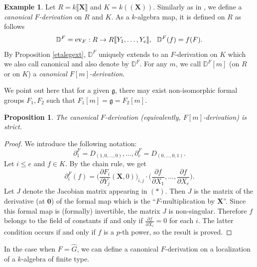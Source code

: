 \documentclass[10pt]{amsart}
\newtheorem{prop}[theorem]{Proposition}
\theoremstyle{definition}
\newtheorem{example}[theorem]{Example}
\begin{document}
\begin{example}\label{canex}
Let $R=k\llbracket \mathbf{X}\rrbracket$ and $K=k((\mathbf{X}))$. Similarly as in \cite[Section 3.2]{HK1}, we define a \emph{canonical $F$-derivation} on $R$ and $K$. As a $k$-algebra map, it is defined on $R$ as follows
$$\mathbb{D}^F=\operatorname{ev}_F:R\to R\llbracket Y_1,\ldots,Y_e\rrbracket,\ \ \mathbb{D}^F(f)=f(F).$$
By Proposition \ref{etalegext}, $\mathbb{D}^F$ uniquely extends to an $F$-derivation on $K$ which we also call canonical and also denote by $\mathbb{D}^F$. For any $m$, we call $\mathbb{D}^F[m]$ (on $R$ or on $K$) a \emph{canonical $F[m]$-derivation}.
\end{example}
\noindent
We point out here that for a given $\mathfrak{g}$, there may exist non-isomorphic formal groups $F_1,F_2$ such that $F_1[m]=\mathfrak{g}=F_2[m]$.
\begin{prop}\label{canstrict}
The canonical $F$-derivation (equivalently, $F[m]$-derivation) is strict.
\end{prop}
\begin{proof}
We introduce the following notation:
$$\partial^F_1=D_{(1,0,\ldots,0)},\ldots,\partial^F_e=D_{(0,\ldots,0,1)}.$$
Let $i\leqslant e$ and $f\in K$. By the chain rule, we get
\begin{equation}
\partial^F_i(f)=\Big(\frac{\partial F_i}{\partial Y_j}(\mathbf{X},0)\Big)_{i,j}\cdot \Big(\frac{\partial f}{\partial X_1},\ldots,\frac{\partial f}{\partial X_e}\Big).\tag{$*$}
\end{equation}
Let $J$ denote the Jacobian matrix appearing in $(*)$. Then $J$ is the matrix of the derivative (at $\mathbf{0}$) of the formal map which is the ``$F$-multiplication by $\mathbf{X}$''. Since this formal map is (formally) invertible, the matrix $J$ is non-singular. Therefore $f$ belongs to the field of constants if and only if $\frac{\partial f}{\partial X_i}=0$ for each $i$. The latter condition occurs if and only if $f$ is a $p$-th power, so the result is proved.
\end{proof}
\noindent
In the case when $F=\widehat{G}$, we can define a canonical $F$-derivation on a localization of a $k$-algebra of finite type.
\end{document}
